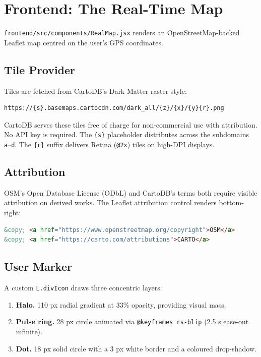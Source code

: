 \documentclass[11pt, a4paper]{article}
\newcommand{\file}[1]{\texttt{\small\color{rsblue}#1}}
\newcommand{\code}[1]{\texttt{\small#1}}
\begin{document}
\section{Frontend: The Real-Time Map}

\file{frontend/src/components/RealMap.jsx} renders an OpenStreetMap-backed Leaflet map centred on the user's GPS coordinates.

\subsection{Tile Provider}

Tiles are fetched from CartoDB's Dark Matter raster style:

\begin{lstlisting}[language={},numbers=none,frame=none]
https://{s}.basemaps.cartocdn.com/dark_all/{z}/{x}/{y}{r}.png
\end{lstlisting}

CartoDB serves these tiles free of charge for non-commercial use with attribution. No API key is required. The \code{\{s\}} placeholder distributes across the subdomains \code{a}--\code{d}. The \code{\{r\}} suffix delivers Retina (\code{@2x}) tiles on high-DPI displays.

\subsection{Attribution}

OSM's Open Database License (ODbL) and CartoDB's terms both require visible attribution on derived works. The Leaflet attribution control renders bottom-right:

\begin{lstlisting}[language=HTML,numbers=none,frame=none]
&copy; <a href="https://www.openstreetmap.org/copyright">OSM</a>
&copy; <a href="https://carto.com/attributions">CARTO</a>
\end{lstlisting}

\subsection{User Marker}

A custom \code{L.divIcon} draws three concentric layers:

\begin{enumerate}[leftmargin=*, itemsep=2pt, topsep=2pt]
  \item \textbf{Halo.} 110 px radial gradient at 33\% opacity, providing visual mass.
  \item \textbf{Pulse ring.} 28 px circle animated via \code{@keyframes rs-blip} (2.5 s ease-out infinite).
  \item \textbf{Dot.} 18 px solid circle with a 3 px white border and a coloured drop-shadow.
\end{enumerate}
\end{document}
